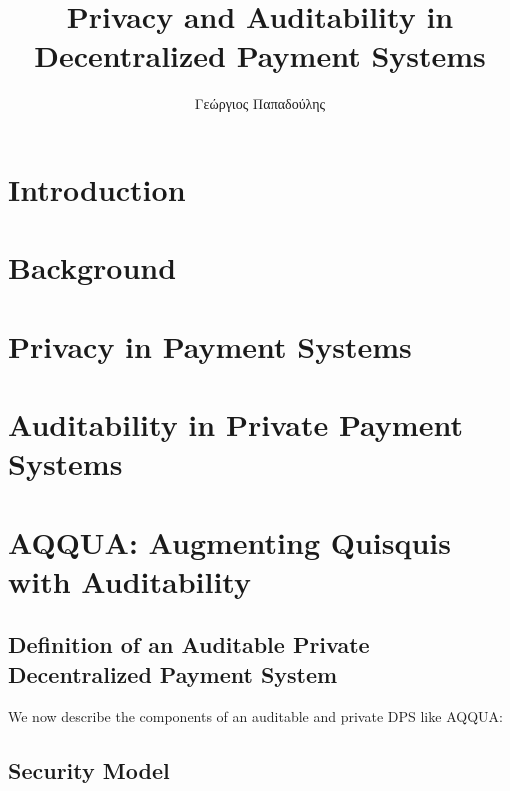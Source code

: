\documentclass[a4paper, thm-restate]{book}
\title{Privacy and Auditability in Decentralized Payment Systems}
\author{Γεώργιος Παπαδούλης }
\begin{document}
    
    \sle
    
    \newpage

    \tableofcontents
    
    \chapter{Introduction}
        

    \chapter{Background}
        
        
    
    \chapter{Privacy in Payment Systems}
        
        

    \chapter{Auditability in Private Payment Systems}
    
    

    \chapter{AQQUA: Augmenting Quisquis with Auditability}
        
        \section{Definition of an Auditable Private Decentralized Payment System}
        We now describe the components of an auditable and private DPS like AQQUA:

        
        
        
        
        
        

        \section{Security Model}\label{sec:model}
        
        
        
\end{document}
